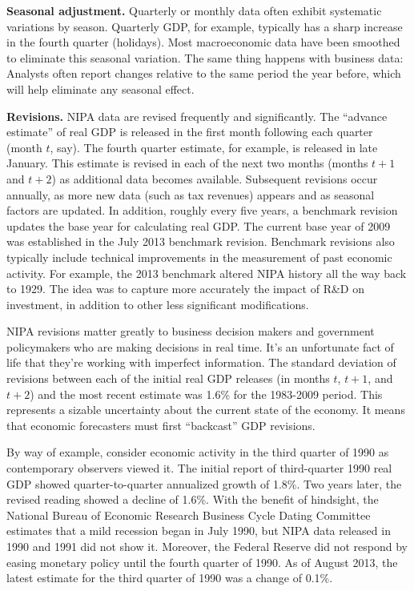 \textbf{Seasonal adjustment. }
Quarterly or monthly data often exhibit systematic variations by season.
Quarterly GDP, for example, typically has a sharp increase in the fourth quarter
(holidays).
Most macroeconomic data have been smoothed to eliminate this seasonal variation.
The same thing happens with business data: Analysts often report changes relative to the same period the year before,
which will help eliminate any seasonal effect.

\textbf{Revisions.}
NIPA data are revised frequently and significantly. The ``advance estimate''
of real GDP  is released in the first month following each quarter (month $t$, say).
The fourth quarter estimate, for example, is released in late January.
This estimate is revised in each of the next two months (months $t+1$ and $t+2$)
as additional data becomes available.
Subsequent revisions occur annually, as more new data (such as tax revenues) appears
and as seasonal factors are updated. In addition, roughly every five years,
a benchmark revision updates the base year for calculating real GDP. The current
base year of 2009 was established in the July 2013 benchmark revision. Benchmark
revisions also typically include technical improvements in the measurement of
past economic activity. For example, the 2013 benchmark altered NIPA history
all the way back to 1929.
The idea was to capture more accurately the impact of R\&D on investment,
in addition to other less significant modifications.


NIPA revisions matter greatly to business decision makers and
government policymakers who are making decisions in real time.
It's an unfortunate fact of life that they're working with imperfect information.
The standard deviation of revisions between each of the initial real GDP releases
(in months $t$, $t+1$, and $t+2$) and the most recent estimate was 1.6\%
for the 1983-2009 period. This represents a sizable uncertainty about
the current state of the economy. It means
that economic forecasters must first ``backcast'' GDP revisions.

By way of example, consider economic activity in the third quarter of
1990 as contemporary observers viewed it.
The initial report of third-quarter 1990
real GDP showed quarter-to-quarter annualized growth of 1.8\%.
Two years later, the revised reading showed a decline of 1.6\%.
With the benefit of hindsight, the National
Bureau of Economic Research Business Cycle Dating Committee estimates that a
mild recession began in July 1990, but NIPA data released in 1990 and 1991 did
not show it. Moreover, the Federal Reserve did not respond by easing monetary policy
until the fourth quarter of 1990.
As of August 2013, the latest estimate for the third quarter of 1990 was a change
of 0.1\%.



